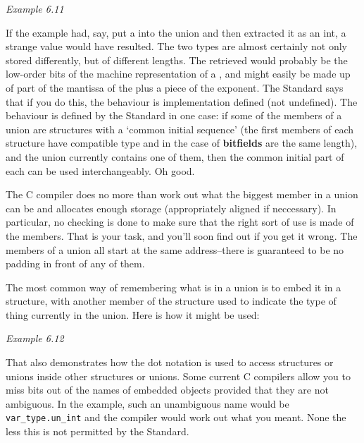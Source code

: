    \begin{center}\textit{Example 6.11}\end{center}


  If the example had, say, put a \float{} into the union and then
   extracted it as an int, a strange value would have resulted. The two types
   are almost certainly not only stored differently, but of different lengths.
   The \kint{} retrieved would probably be the low-order bits of the
   machine representation of a \float, and might easily be made up
   of part of the mantissa of the \float{} plus a piece of the
   exponent. The Standard says that if you do this, the behaviour is
   implementation defined (not undefined). The behaviour is defined by the
   Standard in one case: if some of the members of a union are structures with
   a `common initial sequence' (the first members of each structure have
   compatible type and in the case of \textbf{bitfields} are the same
   length), and the union currently contains one of them, then the common
   initial part of each can be used interchangeably. Oh good.


  The C compiler does no more than work out what the biggest member in
   a union can be and allocates enough storage (appropriately aligned if
   neccessary). In particular, no checking is done to make sure that the right
   sort of use is made of the members. That is your task, and you'll soon find
   out if you get it wrong. The members of a union all start at the same
   address--there is guaranteed to be no padding in front of any of
   them.


  The most common way of remembering what is in a union is to embed it in
   a structure, with another member of the structure used to indicate the type
   of thing currently in the union. Here is how it might be used:


   \begin{center}\textit{Example 6.12}\end{center}


  That also demonstrates how the dot notation is used to access structures
   or unions inside other structures or unions. Some current C compilers allow
   you to miss bits out of the names of embedded objects provided that they are
   not ambiguous. In the example, such an unambiguous name would be
   \texttt{var\_type.un\_int} and the compiler would work out what you meant.
   None the less this is not permitted by the Standard.


